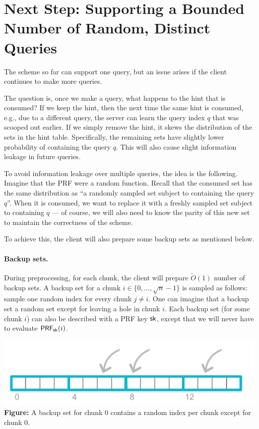 \section{Next Step: Supporting a Bounded Number of Random, Distinct Queries}
The scheme so far can support one query, but 
an issue arises if the client continues to make more queries.

The question is, 
once we make a query, 
what happens to the hint that is consumed? 
If we keep the hint, then the next time the same hint
is consumed, e.g., due to a different query, the server  
can learn the query index $q$ that was scooped out earlier.  
If we simply remove the hint, it skews the distribution of the sets 
in the hint table.
Specifically, the remaining sets have slightly lower
probability of containing the query $q$. 
This will also cause slight information leakage 
in future queries.

To avoid information leakage over multiple queries, 
the idea is the following. 
Imagine that the PRF were a random function.
Recall that the consumed set has the same distribution
as ``a randomly sampled set subject to containing the query $q$''.
When it is consumed, 
we want to replace it with a freshly sampled
set subject to containing $q$ --- of course, we will also need to know the parity
of this new set to maintain the correctness of the scheme. 

To achieve this, the client will also prepare  
some backup sets as mentioned below.

\paragraph{Backup sets.}
During preprocessing, 
for each chunk, the client will prepare 
$\widetilde{O}(1)$ number of backup sets.
A backup
set for a chunk $i \in \{0, \ldots, \sqrt{n}-1\}$ 
is sampled as follows:
sample one random index 
for every chunk $j \neq i$.
One can imagine that 
a backup set a random set except for leaving a hole in chunk $i$.
Each backup set (for some chunk $i$) 
can also be described with a PRF key ${\sf sk}$, except that 
we will never have to evaluate ${\sf PRF}_{{\sf sk}}(i)$.

\newpage
\begin{center}
    \includegraphics[scale=0.6]{piano-backupset}\\
{\bf Figure:} %
A backup set for chunk $0$ contains a random index per chunk except for chunk $0$. 
\end{center}




